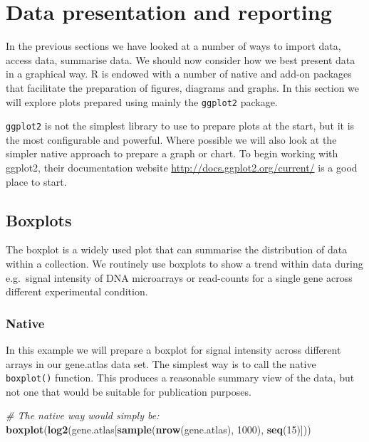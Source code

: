 \documentclass[a4paper]{book}
\newenvironment{Shaded}{\begin{snugshade}}{\end{snugshade}}
\newcommand{\KeywordTok}[1]{\textcolor[rgb]{0.13,0.29,0.53}{\textbf{{#1}}}}
\newcommand{\DecValTok}[1]{\textcolor[rgb]{0.00,0.00,0.81}{{#1}}}
\newcommand{\CommentTok}[1]{\textcolor[rgb]{0.56,0.35,0.01}{\textit{{#1}}}}
\newcommand{\NormalTok}[1]{{#1}}
\renewenvironment{Shaded}
{\vspace{1.5em}\begin{leftbar}\begin{snugshade}}
{\end{snugshade}\end{leftbar}\vspace{3pt}}
\begin{document}
\chapter{Data presentation and
reporting}\label{data-presentation-and-reporting}

In the previous sections we have looked at a number of ways to import
data, access data, summarise data. We should now consider how we best
present data in a graphical way. R is endowed with a number of native
and add-on packages that facilitate the preparation of figures, diagrams
and graphs. In this section we will explore plots prepared using mainly
the \texttt{ggplot2} package.

\texttt{ggplot2} is not the simplest library to use to prepare plots at
the start, but it is the most configurable and powerful. Where possible
we will also look at the simpler native approach to prepare a graph or
chart. To begin working with ggplot2, their documentation website
\url{http://docs.ggplot2.org/current/} is a good place to start.

\section{Boxplots}\label{boxplots}

The boxplot is a widely used plot that can summarise the distribution of
data within a collection. We routinely use boxplots to show a trend
within data during e.g.~signal intensity of DNA microarrays or
read-counts for a single gene across different experimental condition.

\subsection{Native}\label{native}

In this example we will prepare a boxplot for signal intensity across
different arrays in our gene.atlas data set. The simplest way is to call
the native \texttt{boxplot()} function. This produces a reasonable
summary view of the data, but not one that would be suitable for
publication purposes.

\begin{Shaded}
\begin{Highlighting}[]
\CommentTok{# The native way would simply be:}
\KeywordTok{boxplot}\NormalTok{(}\KeywordTok{log2}\NormalTok{(gene.atlas[}\KeywordTok{sample}\NormalTok{(}\KeywordTok{nrow}\NormalTok{(gene.atlas), }\DecValTok{1000}\NormalTok{), }\KeywordTok{seq}\NormalTok{(}\DecValTok{15}\NormalTok{)]))}
\end{Highlighting}
\end{Shaded}
\end{document}
